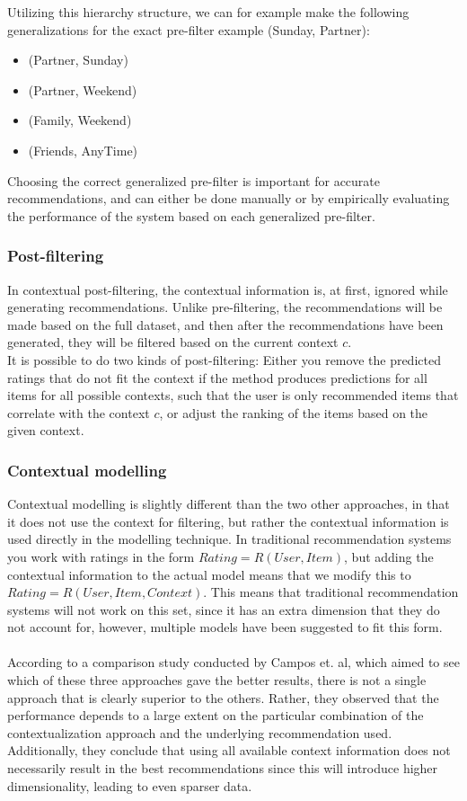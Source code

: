 Utilizing this hierarchy structure, we can for example make the following generalizations for the exact pre-filter example (Sunday, Partner):
\begin{itemize}
	\item (Partner, Sunday)
	\item (Partner, Weekend)
	\item (Family, Weekend)
	\item (Friends, AnyTime)
\end{itemize}

Choosing the correct generalized pre-filter is important for accurate recommendations, and can either be done manually or by empirically evaluating the performance of the system based on each generalized pre-filter.

\subsubsection*{Post-filtering}
In contextual post-filtering, the contextual information is, at first, ignored while generating recommendations.
Unlike pre-filtering, the recommendations will be made based on the full dataset, and then after the recommendations have been generated, they will be filtered based on the current context $c$.\\
It is possible to do two kinds of post-filtering: Either you remove the predicted ratings that do not fit the context if the method produces predictions for all items for all possible contexts, such that the user is only recommended items that correlate with the context $c$, or adjust the ranking of the items based on the given context.

\subsubsection*{Contextual modelling}
Contextual modelling is slightly different than the two other approaches, in that it does not use the context for filtering, but rather the contextual information is used directly in the modelling technique.
In traditional recommendation systems you work with ratings in the form $Rating = R(User, Item)$, but adding the contextual information to the actual model means that we modify this to $Rating = R(User, Item, Context)$.
This means that traditional recommendation systems will not work on this set, since it has an extra dimension that they do not account for, however, multiple models have been suggested to fit this form\cite{Adomavicius2011}.
\\\\
According to a comparison study conducted by Campos et. al\cite{10.1007/978-3-642-39878-0_13}, which aimed to see which of these three approaches gave the better results, there is not a single approach that is clearly superior to the others.
Rather, they observed that the performance depends to a large extent on the particular combination of the contextualization approach and the underlying recommendation used.\\
Additionally, they conclude that using all available context information does not necessarily result in the best recommendations since this will introduce higher dimensionality, leading to even sparser data.

